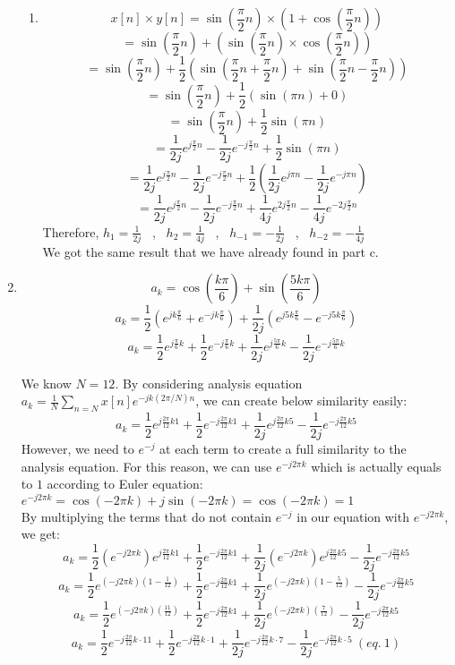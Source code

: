 \documentclass[10pt,a4paper, margin=1in]{article}
\begin{document}
\begin{enumerate}
\begin{enumerate}
    \item %
    \[ x[n] \times y[n] = \sin(\frac{\pi}{2}n) \times (1+ \cos(\frac{\pi}{2}n)) \]
    \[ = \sin(\frac{\pi}{2}n) + (\sin(\frac{\pi}{2}n) \times \cos(\frac{\pi}{2}n)) \]
    \[ = \sin(\frac{\pi}{2}n) + \frac{1}{2}(\sin(\frac{\pi}{2}n + \frac{\pi}{2}n) + \sin(\frac{\pi}{2}n - \frac{\pi}{2}n)) \]
     \[ = \sin(\frac{\pi}{2}n) + \frac{1}{2}(\sin(\pi n) + 0) \]
        \[ = \sin(\frac{\pi}{2}n) + \frac{1}{2}\sin(\pi n) \]
        \[ = \frac{1}{2j}e^{j\frac{\pi}{2}n} - \frac{1}{2j}e^{-j\frac{\pi}{2}n} + \frac{1}{2}\sin(\pi n) \]
        \[ = \frac{1}{2j}e^{j\frac{\pi}{2}n} - \frac{1}{2j}e^{-j\frac{\pi}{2}n} + \frac{1}{2}(\frac{1}{2j}e^{j \pi n} - \frac{1}{2j}e^{-j \pi n})  \]
        \[ = \frac{1}{2j}e^{j\frac{\pi}{2}n} - \frac{1}{2j}e^{-j\frac{\pi}{2}n} + \frac{1}{4j}e^{2j \frac{\pi}{2} n} - \frac{1}{4j}e^{-2j \frac{\pi}{2} n}  \]
        Therefore, $h_1 = \frac{1}{2j}$ \ , \ $h_2 = \frac{1}{4j}$ \ , \ $h_{-1} = - \frac{1}{2j}$ \ , \ $h_{-2} = - \frac{1}{4j}$ \\
        We got the same result that we have already found in part c.
    \end{enumerate}

\item %
\[ a_k = \cos(\frac{k\pi}{6}) + \sin(\frac{5k\pi}{6}) \]
\[ a_k = \frac{1}{2}(e^{jk\frac{\pi}{6}} + e^{-jk\frac{\pi}{6}}) + \frac{1}{2j}(e^{j5k\frac{\pi}{6}} - e^{-j5k\frac{\pi}{6}}) \]
\[ a_k = \frac{1}{2}e^{j\frac{\pi}{6}k} + \frac{1}{2}e^{-j\frac{\pi}{6}k} + \frac{1}{2j}e^{j\frac{5\pi}{6}k} -\frac{1}{2j}e^{-j\frac{5\pi}{6}k} \]

We know $N = 12$. By considering analysis equation $a_k = \frac{1}{N} \sum_{n=N}^{} x[n]e^{-jk(2\pi/N)n}$, we can create below similarity easily: \\
\[ a_k = \frac{1}{2}e^{j\frac{2\pi}{12}k1} + \frac{1}{2}e^{-j\frac{2\pi}{12}k1} + \frac{1}{2j}e^{j\frac{2\pi}{12}k5} -\frac{1}{2j}e^{-j\frac{2\pi}{12}k5} \]
However, we need to $e^{-j}$ at each term to create a full similarity to the analysis equation. For this reason, we can use $e^{-j2\pi k}$ which is actually equals to $1$ according to Euler equation: \\
$e^{-j2\pi k} = \cos(-2\pi k) + j\sin(-2\pi k) = \cos(-2\pi k) = 1$ \\
By multiplying the terms that do not contain $e^{-j}$ in our equation with $e^{-j2\pi k}$, we get: 
\[ a_k = \frac{1}{2}(e^{-j2\pi k})e^{j\frac{2\pi}{12}k1} + \frac{1}{2}e^{-j\frac{2\pi}{12}k1} + \frac{1}{2j}(e^{-j2\pi k})e^{j\frac{2\pi}{12}k5} -\frac{1}{2j}e^{-j\frac{2\pi}{12}k5} \]
\[ a_k = \frac{1}{2}e^{(-j2\pi k)(1 - \frac{1}{12})} + \frac{1}{2}e^{-j\frac{2\pi}{12}k1} + \frac{1}{2j}e^{(-j2\pi k)(1 - \frac{5}{12})} -\frac{1}{2j}e^{-j\frac{2\pi}{12}k5} \]
\[ a_k = \frac{1}{2}e^{(-j2\pi k)(\frac{11}{12})} + \frac{1}{2}e^{-j\frac{2\pi}{12}k1} + \frac{1}{2j}e^{(-j2\pi k)(\frac{7}{12})} -\frac{1}{2j}e^{-j\frac{2\pi}{12}k5} \]
\[ a_k = \frac{1}{2}e^{-j\frac{2\pi}{12} k \cdot 11} + \frac{1}{2}e^{-j\frac{2\pi}{12}k \cdot 1} + \frac{1}{2j}e^{-j\frac{2\pi}{12} k \cdot 7} -\frac{1}{2j}e^{-j\frac{2\pi}{12}k \cdot 5} \ (eq. \ 1) \]


\end{enumerate}
\end{document}
